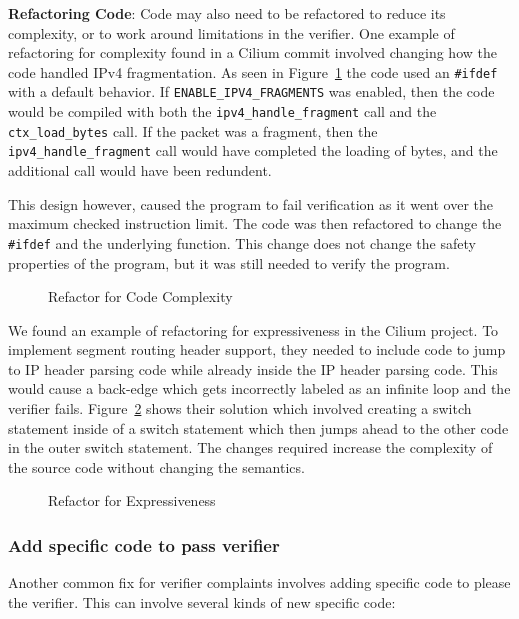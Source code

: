 \noindent\textbf{Refactoring Code}:
Code may also need to be refactored to reduce its complexity, or to work around limitations in the verifier.
One example of refactoring for complexity found in a Cilium commit involved changing how the code handled IPv4 fragmentation.
As seen in Figure~\ref{fig:refactor-fix} the code used an \texttt{\#ifdef} with a default behavior.
If \texttt{ENABLE\_IPV4\_FRAGMENTS} was enabled, then the code would be compiled with both the \texttt{ipv4\_handle\_fragment} call and the \texttt{ctx\_load\_bytes} call.
If the packet was a fragment, then the \texttt{ipv4\_handle\_fragment} call would have completed the loading of bytes, and the additional call would have been redundent.

This design however, caused the program to fail verification as it went over the maximum checked instruction limit.
The code was then refactored to change the \texttt{\#ifdef} and the underlying function.
This change does not change the safety properties of the program, but it was still needed to verify the program.

\begin{figure}
    
    \caption{Refactor for Code Complexity}
    \label{fig:refactor-fix}
\end{figure}


We found an example of refactoring for expressiveness in the Cilium project.
To implement segment routing header support, they needed to include code to jump to IP header parsing code while already inside the IP header parsing code.
This would cause a back-edge which gets incorrectly labeled as an infinite loop and the verifier fails.
Figure~\ref{fig:switch} shows their solution which involved creating a switch statement inside of a switch statement which then jumps ahead to the other code in the outer switch statement.
The changes required increase the complexity of the source code without changing the semantics.

\begin{figure}
    
    \caption{Refactor for Expressiveness}
    \label{fig:switch}
\end{figure}

\subsubsection{Add specific code to pass verifier}
Another common fix for verifier complaints involves adding specific code to please
    the verifier.
This can involve several kinds of new specific code:

